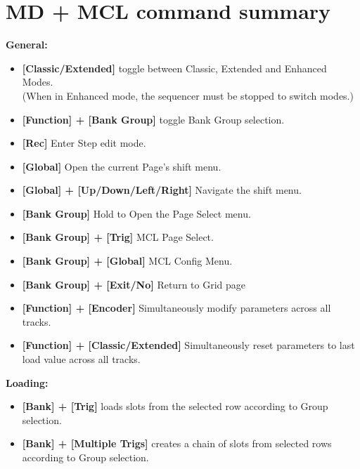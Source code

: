 \section{MD + MCL command summary}

\textbf{General:}
   \begin{itemize}
      \item \textbf{[Classic/Extended] } toggle between Classic, Extended and Enhanced Modes.\\(When in Enhanced mode, the sequencer must be stopped to switch modes.)
      \item \textbf{[Function] + [Bank Group]} toggle Bank Group selection.
      \item \textbf{[Rec]} Enter Step edit mode.
      \item \textbf{[Global]} Open the current Page's shift menu.
      \item \textbf{[Global] + [Up/Down/Left/Right]} Navigate the shift menu.
      \item \textbf{[Bank Group]} Hold to Open the Page Select menu.
      \item \textbf{[Bank Group] + [Trig]} MCL Page Select.
      \item \textbf{[Bank Group] + [Global]} MCL Config Menu. 
      \item \textbf{[Bank Group] + [Exit/No]} Return to Grid page
      \item \textbf{[Function] + [Encoder]} Simultaneously modify parameters across all tracks. 
       \item \textbf{[Function] + [Classic/Extended]} Simultaneously reset parameters to last load value across all tracks.
 \end{itemize}
 
\textbf{Loading:}
   \begin{itemize}
      \item \textbf{[Bank] + [Trig]} loads slots from the selected row according to Group selection.
      \item \textbf{[Bank] + [Multiple Trigs]} creates a chain of slots from selected rows according to Group selection.
   \end{itemize}

